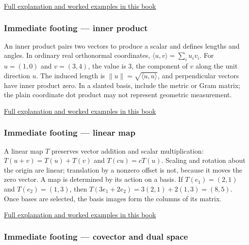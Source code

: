 \hyperref[01-foundations-i-ch018-determinant-measures-oriented-volume-and-exposes-lost-dimensions]{Full explanation and worked examples in this book}

\subsubsection{Immediate footing --- inner product}\label{01-foundations-i-ch018-immediate-footing-inner-product}

\hypertarget{01-foundations-i-ch018-immediate-footing-inner-product}{}

An inner product pairs two vectors to produce a scalar and defines lengths and angles. In ordinary real orthonormal coordinates, \(\langle u,v\rangle=\sum_i u_i v_i\). For \(u=(1,0)\) and \(v=(3,4)\), the value is \(3\), the component of \(v\) along the unit direction \(u\). The induced length is \(\|u\|=\sqrt{\langle u,u\rangle}\), and perpendicular vectors have inner product zero. In a slanted basis, include the metric or Gram matrix; the plain coordinate dot product may not represent geometric measurement.

\hyperref[01-foundations-i-ch017-the-dot-product-turns-two-movements-into-a-measurement]{Full explanation and worked examples in this book}

\subsubsection{Immediate footing --- linear map}\label{01-foundations-i-ch018-immediate-footing-linear-map}

\hypertarget{01-foundations-i-ch018-immediate-footing-linear-map}{}

A linear map \(T\) preserves vector addition and scalar multiplication: \(T(u+v)=T(u)+T(v)\) and \(T(cu)=cT(u)\). Scaling and rotation about the origin are linear; translation by a nonzero offset is not, because it moves the zero vector. A map is determined by its action on a basis. If \(T(e_1)=(2,1)\) and \(T(e_2)=(1,3)\), then \(T(3e_1+2e_2)=3(2,1)+2(1,3)=(8,5)\). Once bases are selected, the basis images form the columns of its matrix.

\hyperref[01-foundations-i-ch018-the-robot-needs-a-rule-for-moving-every-direction]{Full explanation and worked examples in this book}

\subsubsection{Immediate footing --- covector and dual space}\label{01-foundations-i-ch018-immediate-footing-covector-and-dual-space}

